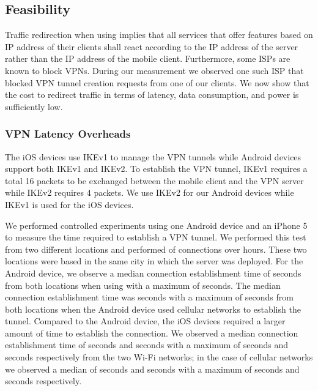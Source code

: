 \subsection{Feasibility}

Traffic redirection when using \platname implies that all services that offer features based on IP address of their clients shall react according to the IP address of the server rather than the IP address of the mobile client.
Furthermore, some ISPs are known to block VPNs. 
During our measurement we observed one such ISP that blocked VPN tunnel creation requests from one of our clients.
We now show that the cost to redirect traffic in terms of latency, data consumption, and power is sufficiently low.

\subsubsection{VPN Latency Overheads }
The iOS devices use IKEv1 to manage the VPN tunnels while Android devices support both IKEv1 and IKEv2. 
To establish the VPN tunnel, IKEv1 requires a total 16 packets to be exchanged between the mobile client and the VPN server while IKEv2 requires 4 packets.
We use IKEv2 for our Android devices while IKEv1 is used for the iOS devices. 

We performed controlled experiments using one Android device and an iPhone 5 to measure the time required to establish a VPN tunnel. 
We performed this test from two different locations and performed  of connections over \tbdv{} hours. 
These two locations were based in the same city in which the server was deployed. 
For the Android device, we observe a median connection establishment time of  seconds from both locations when using \wifi with a maximum of  seconds. 
The median connection establishment time was  seconds with a maximum of  seconds from both locations when the Android device used cellular networks to establish the tunnel.
Compared to the Android device, the iOS devices required a larger amount of time to establish the connection. 
We observed a median connection establishment time of  seconds and  seconds with a maximum of  seconds and  seconds respectively from the two Wi-Fi networks; in the case of cellular networks  we observed a median of  seconds and  seconds with a maximum of  seconds and  seconds respectively. 


